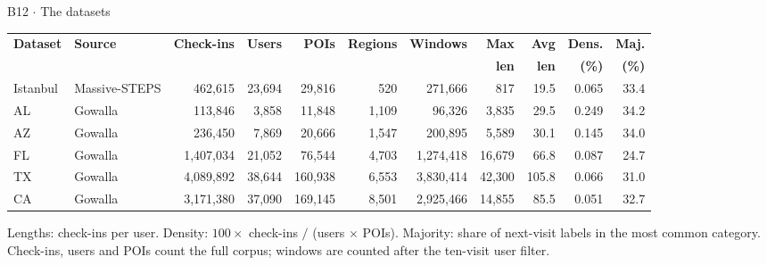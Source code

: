 \documentclass{beamer}
\begin{document}
\begin{frame}{B12 $\cdot$ The datasets}
    \vspace{0pt}%
    \begin{center}
    \footnotesize
    \setlength{\tabcolsep}{2.4pt}
    \begin{tabular}{@{}llrrrrrrrrr@{}}
        \toprule
        \textbf{Dataset} & \textbf{Source} & \textbf{Check-ins} & \textbf{Users} & \textbf{POIs} &
        \textbf{Regions} & \textbf{Windows} & \textbf{Max} & \textbf{Avg} & \textbf{Dens.} & \textbf{Maj.} \\
        & & & & & & & \textbf{len} & \textbf{len} & \textbf{(\%)} & \textbf{(\%)} \\
        \midrule
        Istanbul & Massive-STEPS & 462,615 & 23,694 & 29,816 & 520 & 271,666 & 817 & 19.5 & 0.065 & 33.4 \\
        AL & Gowalla & 113,846 & 3,858 & 11,848 & 1,109 & 96,326 & 3,835 & 29.5 & 0.249 & 34.2 \\
        AZ & Gowalla & 236,450 & 7,869 & 20,666 & 1,547 & 200,895 & 5,589 & 30.1 & 0.145 & 34.0 \\
        FL & Gowalla & 1,407,034 & 21,052 & 76,544 & 4,703 & 1,274,418 & 16,679 & 66.8 & 0.087 & 24.7 \\
        TX & Gowalla & 4,089,892 & 38,644 & 160,938 & 6,553 & 3,830,414 & 42,300 & 105.8 & 0.066 & 31.0 \\
        CA & Gowalla & 3,171,380 & 37,090 & 169,145 & 8,501 & 2,925,466 & 14,855 & 85.5 & 0.051 & 32.7 \\
        \bottomrule
    \end{tabular}
    \end{center}
    \medskip
    {\footnotesize Lengths: check-ins per user. Density: $100\times$ check-ins $/$ (users $\times$ POIs).
    Majority: share of next-visit labels in the most common category. Check-ins, users and POIs count
    the full corpus; windows are counted after the ten-visit user filter.\par}
\end{frame}
\end{document}
